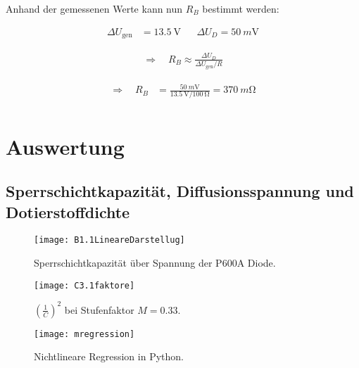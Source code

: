 \documentclass[
	a4paper, %
	12pt, %
]{CSUniSchoolLabReport}
\newcommand{\milli}{m}
\begin{document}
Anhand der gemessenen Werte kann nun $R_B$ bestimmt werden:

\begin{align*}
	\Delta U_{\text{gen}} &= \SI{13.5}{\volt} 
	&& \Delta U_D = \SI{50}{\milli\volt}
\end{align*}

\begin{align*}
	\Rightarrow\quad 
	R_B \approx \frac{\Delta U_D}{\Delta U_{\text{gen}} / R}
\end{align*}

\begin{align*}
	\Rightarrow\quad 
	R_B &= \frac{\SI{50}{\milli\volt}}{\SI{13.5}{\volt} / \SI{100}\ohm}  =  \SI{370}{\milli\ohm} \\
\end{align*}

\vspace{1em}


\section{Auswertung}

\subsection{Sperrschichtkapazität, Diffusionsspannung und \\Dotierstoffdichte}

\begin{figure}[H] %
	\centering %
	\texttt{[image: B1.1LineareDarstellug]} %
	\caption{Sperrschichtkapazität über Spannung der P600A Diode.}
	\label{fig:Sperrschichtkap}
\end{figure}

\begin{figure}[H] %
	\centering %
	\texttt{[image: C3.1faktore]} %
	\caption{$(\frac{1}{C})^2$ bei Stufenfaktor $M=0.33$.}
\end{figure}
\begin{figure}[H] %
	\centering %
	\texttt{[image: mregression]} %
	\caption{Nichtlineare Regression in Python.}
\end{figure}
\end{document}
